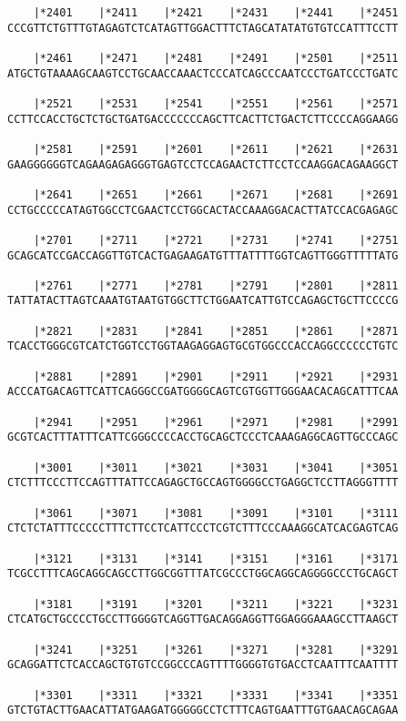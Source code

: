 \documentclass{article}
\begin{document}
\begin{Verbatim}
    |*2401    |*2411    |*2421    |*2431    |*2441    |*2451
CCCGTTCTGTTTGTAGAGTCTCATAGTTGGACTTTCTAGCATATATGTGTCCATTTCCTT
  
    |*2461    |*2471    |*2481    |*2491    |*2501    |*2511
ATGCTGTAAAAGCAAGTCCTGCAACCAAACTCCCATCAGCCCAATCCCTGATCCCTGATC
  
    |*2521    |*2531    |*2541    |*2551    |*2561    |*2571
CCTTCCACCTGCTCTGCTGATGACCCCCCCAGCTTCACTTCTGACTCTTCCCCAGGAAGG
  
    |*2581    |*2591    |*2601    |*2611    |*2621    |*2631
GAAGGGGGGTCAGAAGAGAGGGTGAGTCCTCCAGAACTCTTCCTCCAAGGACAGAAGGCT
  
    |*2641    |*2651    |*2661    |*2671    |*2681    |*2691
CCTGCCCCCATAGTGGCCTCGAACTCCTGGCACTACCAAAGGACACTTATCCACGAGAGC
  
    |*2701    |*2711    |*2721    |*2731    |*2741    |*2751
GCAGCATCCGACCAGGTTGTCACTGAGAAGATGTTTATTTTGGTCAGTTGGGTTTTTATG
  
    |*2761    |*2771    |*2781    |*2791    |*2801    |*2811
TATTATACTTAGTCAAATGTAATGTGGCTTCTGGAATCATTGTCCAGAGCTGCTTCCCCG
  
    |*2821    |*2831    |*2841    |*2851    |*2861    |*2871
TCACCTGGGCGTCATCTGGTCCTGGTAAGAGGAGTGCGTGGCCCACCAGGCCCCCCTGTC
  
    |*2881    |*2891    |*2901    |*2911    |*2921    |*2931
ACCCATGACAGTTCATTCAGGGCCGATGGGGCAGTCGTGGTTGGGAACACAGCATTTCAA
  
    |*2941    |*2951    |*2961    |*2971    |*2981    |*2991
GCGTCACTTTATTTCATTCGGGCCCCACCTGCAGCTCCCTCAAAGAGGCAGTTGCCCAGC
  
    |*3001    |*3011    |*3021    |*3031    |*3041    |*3051
CTCTTTCCCTTCCAGTTTATTCCAGAGCTGCCAGTGGGGCCTGAGGCTCCTTAGGGTTTT
  
    |*3061    |*3071    |*3081    |*3091    |*3101    |*3111
CTCTCTATTTCCCCCTTTCTTCCTCATTCCCTCGTCTTTCCCAAAGGCATCACGAGTCAG
  
    |*3121    |*3131    |*3141    |*3151    |*3161    |*3171
TCGCCTTTCAGCAGGCAGCCTTGGCGGTTTATCGCCCTGGCAGGCAGGGGCCCTGCAGCT
  
    |*3181    |*3191    |*3201    |*3211    |*3221    |*3231
CTCATGCTGCCCCTGCCTTGGGGTCAGGTTGACAGGAGGTTGGAGGGAAAGCCTTAAGCT
  
    |*3241    |*3251    |*3261    |*3271    |*3281    |*3291
GCAGGATTCTCACCAGCTGTGTCCGGCCCAGTTTTGGGGTGTGACCTCAATTTCAATTTT
  
    |*3301    |*3311    |*3321    |*3331    |*3341    |*3351
GTCTGTACTTGAACATTATGAAGATGGGGGCCTCTTTCAGTGAATTTGTGAACAGCAGAA
  

\end{Verbatim}
\end{document}
